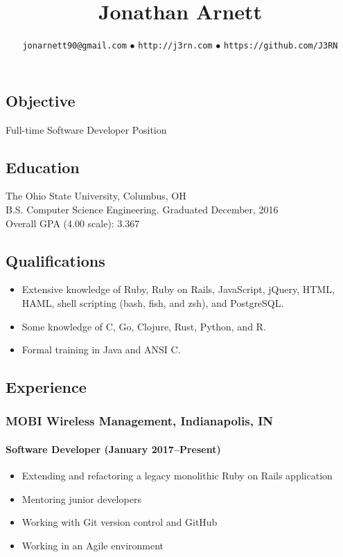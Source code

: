 \documentclass[]{article}
\begin{document}
\title{Jonathan Arnett}
\author{\texttt{jonarnett90@gmail.com} $\bullet$ \texttt{http://j3rn.com} $\bullet$ \texttt{https://github.com/J3RN}}
\date{}
\maketitle

\subsection*{Objective}
Full-time Software Developer Position

\subsection*{Education}
The Ohio State University, Columbus, OH \\
B.S. Computer Science Engineering. Graduated December, 2016 \\
Overall GPA (4.00 scale): 3.367

\subsection*{Qualifications}
\begin{itemize}
\item Extensive knowledge of Ruby, Ruby on Rails, JavaScript, jQuery, HTML, HAML, shell scripting (bash, fish, and zsh), and PostgreSQL.
\item Some knowledge of C, Go, Clojure, Rust, Python, and R.
\item Formal training in Java and ANSI C.
\end{itemize}

\subsection*{Experience}

\subsubsection*{MOBI Wireless Management, Indianapolis, IN}
\paragraph*{Software Developer (January 2017--Present)}
\begin{itemize}
\item Extending and refactoring a legacy monolithic Ruby on Rails application
\item Mentoring junior developers
\item Working with Git version control and GitHub
\item Working in an Agile environment
\end{itemize}
\end{document}
